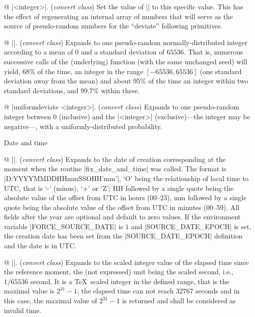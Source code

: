 @ |\setrandomseed <integer>|. ({\sl convert class})\enskip
Set the value of |\randomseed| to this specific value. This has the
effect of regenerating an internal array of numbers that will
serve as the source of pseudo-random numbers for the ``deviate''
following primitives.

@ |\normaldeviate|. ({\sl convert class})\enskip
Expands to one pseudo-random normally-distributed integer according
to a mean of $0$ and a standard deviation of $65536$. That is,
numerous successive calls of the (underlying) function (with the
same unchanged seed) will yield, 68\% of the time, an integer in
the range $[-65536,65536]$ (one standard deviation away from the
mean) and about 95\% of the time an integer within two standard
deviations, and 99.7\% within three.

@ |uniformdeviate <integer>|. ({\sl convert class})\enskip
Expands to one pseudo-random integer between $0$ (inclusive) and the
|<integer>| (exclusive)---the integer may be negative---, with a
uniformly-distributed probability.

\enddiv %

\begindiv Date and time

@ |\creationdate|. ({\sl convert class})\enskip
Expands to the date of creation corresponding at the moment when
the routine |fix_date_and_time| was called.
The format is |D:YYYYMMDDHHmmSSOHH'mm'|,
`O' being the relationship of local time to UTC, that is `-' (minus),
`+' or `Z'; HH followed by a single quote being the absolute value
of the offset from UTC in hours (00--23), mm followed by a single
quote being the absolute value of the offset from UTC in minutes
(00--59). All fields after the year are optional and default to
zero values. If the environment variable |FORCE_SOURCE_DATE| is $1$
and |SOURCE_DATE_EPOCH| is set, the creation date has been set from
the |SOURCE_DATE_EPOCH| definition and the date is in UTC.


@ |\elapsedtime|. ({\sl convert class})\enskip
Expands to the scaled integer value of the elapsed time since the
reference moment, the (not expressed) unit being the scaled second, i.e.,
$1/65536$ second. It is a \TeX\ scaled integer in the defined range,
that is the maximal value is $2^{31}-1$; the elapsed time can not
reach $32767$ seconds and in this case, the maximal value of $2^{31}-1$
is returned and shall be considered as invalid time.

